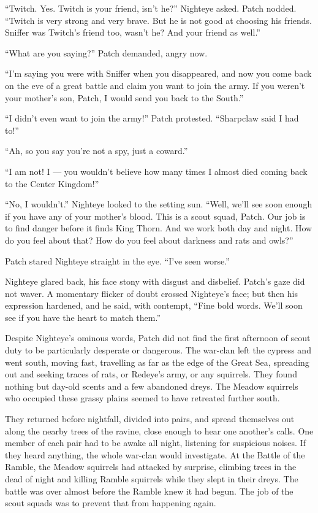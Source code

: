 \documentclass[ebook,oneside,openany,17pt]{memoir}
\begin{document}
“Twitch. Yes. Twitch is your friend, isn’t he?” Nighteye asked. Patch
nodded. “Twitch is very strong and very brave. But he is not good at
choosing his friends. Sniffer was Twitch’s friend too, wasn’t he? And
your friend as well.”

“What are you saying?” Patch demanded, angry now.

“I’m saying you were with Sniffer when you disappeared, and now you
come back on the eve of a great battle and claim you want to join the
army. If you weren’t your mother’s son, Patch, I would send you back
to the South.”

“I didn’t even want to join the army!” Patch protested. “Sharpclaw
said I had to!”

“Ah, so you say you’re not a spy, just a coward.”

“I am not! I — you wouldn’t believe how many times I almost died
coming back to the Center Kingdom!”

“No, I wouldn’t.” Nighteye looked to the setting sun. “Well, we’ll see
soon enough if you have any of your mother’s blood. This is a scout
squad, Patch. Our job is to find danger before it finds King
Thorn. And we work both day and night. How do you feel about that? How
do you feel about darkness and rats and owls?”

Patch stared Nighteye straight in the eye. “I’ve seen worse.”

Nighteye glared back, his face stony with disgust and
disbelief. Patch’s gaze did not waver. A momentary flicker of doubt
crossed Nighteye’s face; but then his expression hardened, and he
said, with contempt, “Fine bold words. We’ll soon see if you have the
heart to match them.”

Despite Nighteye’s ominous words, Patch did not find the first
afternoon of scout duty to be particularly desperate or dangerous. The
war-clan left the cypress and went south, moving fast, travelling as
far as the edge of the Great Sea, spreading out and seeking traces of
rats, or Redeye’s army, or any squirrels. They found nothing but
day-old scents and a few abandoned dreys. The Meadow squirrels who
occupied these grassy plains seemed to have retreated further south.

They returned before nightfall, divided into pairs, and spread
themselves out along the nearby trees of the ravine, close enough to
hear one another’s calls. One member of each pair had to be awake all
night, listening for suspicious noises. If they heard anything, the
whole war-clan would investigate. At the Battle of the Ramble, the
Meadow squirrels had attacked by surprise, climbing trees in the dead
of night and killing Ramble squirrels while they slept in their
dreys. The battle was over almost before the Ramble knew it had
begun. The job of the scout squads was to prevent that from happening
again.
\end{document}
